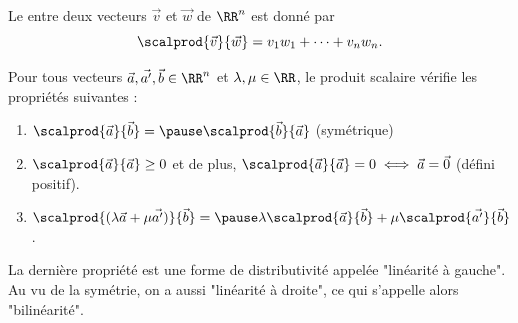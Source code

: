 \documentclass[french,xcolor=svgnames]{beamer}
\begin{document}
\begin{frame}
  \begin{definition}
    Le  entre deux vecteurs \(\vec v\) et \(\vec w\) de \(\RR^{n}\) est donné par
    \begin{equation*}
      \scalprod {\vec v} {\vec w} = v_{1} w_{1} + \cdots + v_{n} w_{n}.
    \end{equation*}
  \end{definition}

\end{frame}
\begin{frame}
  \begin{proposition}Pour tous vecteurs \(\vec a,\vec {a'},\vec b \in \RR^{n}\) et \(\lambda, \mu \in \RR\),\pause{} le produit scalaire vérifie les propriétés suivantes :\pause{}
    \begin{enumerate}
    \item $\scalprod{\vec{a}}{\vec{b}}=\pause\scalprod{\vec{b}}{\vec{a}}$ (symétrique)\pause{}
    \item $\scalprod{\vec{a}}{\vec{a}} \geq 0$\pause{} et de plus, $\scalprod{\vec{a}}{\vec{a}} = 0 \iff \vec{a} = \vec 0$ (défini positif).
    \item $\scalprod{(\lambda \vec{a} + \mu \vec{a'})}{\vec{b}} = \pause \lambda \scalprod{\vec{a}}{\vec{b}} + \mu \scalprod{\vec{a'}}{\vec{b}}$.
    \end{enumerate}
  \end{proposition}\pause{}
  La dernière propriété est une forme de distributivité appelée "linéarité à gauche".\pause{} Au vu de la symétrie\pause{}, on a aussi "linéarité à droite",\pause{} ce qui s'appelle alors "bilinéarité".
  \pause{}
\end{frame}
\end{document}
